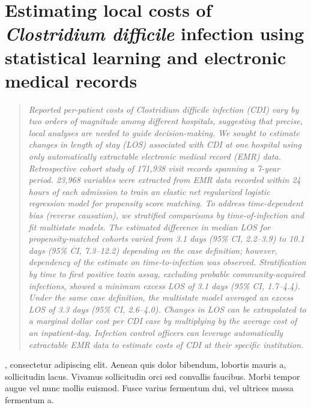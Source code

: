 
\chapter{Estimating local costs of \emph{Clostridium difficile} infection using statistical learning and electronic medical records}
\label{chap:cdi_cost}

\begin{quote}
\emph{Reported per-patient costs of Clostridium difficile infection (CDI) vary by two orders of magnitude among different hospitals, suggesting that precise, local analyses are needed to guide decision-making. We sought to estimate changes in length of stay (LOS) associated with CDI at one hospital using only automatically extractable electronic medical record (EMR) data. Retrospective cohort study of 171,938 visit records spanning a 7-year period. 23,968 variables were extracted from EMR data recorded within 24 hours of each admission to train an elastic net regularized logistic regression model for propensity score matching. To address time-dependent bias (reverse causation), we stratified comparisons by time-of-infection and fit multistate models. The estimated difference in median LOS for propensity-matched cohorts varied from 3.1 days (95\% CI, 2.2–3.9) to 10.1 days (95\% CI, 7.3–12.2) depending on the case definition; however, dependency of the estimate on time-to-infection was observed. Stratification by time to first positive toxin assay, excluding probable community-acquired infections, showed a minimum excess LOS of 3.1 days (95\% CI, 1.7–4.4). Under the same case definition, the multistate model averaged an excess LOS of 3.3 days (95\% CI, 2.6–4.0). Changes in LOS can be extrapolated to a marginal dollar cost per CDI case by multiplying by the average cost of an inpatient-day. Infection control officers can leverage automatically extractable EMR data to estimate costs of CDI at their specific institution.
}
\end{quote}

, consectetur adipiscing elit. Aenean quis dolor bibendum, lobortis mauris a, sollicitudin lacus. Vivamus sollicitudin orci sed convallis faucibus. Morbi tempor augue vel nunc mollis euismod. Fusce varius fermentum dui, vel ultrices massa fermentum a. 
